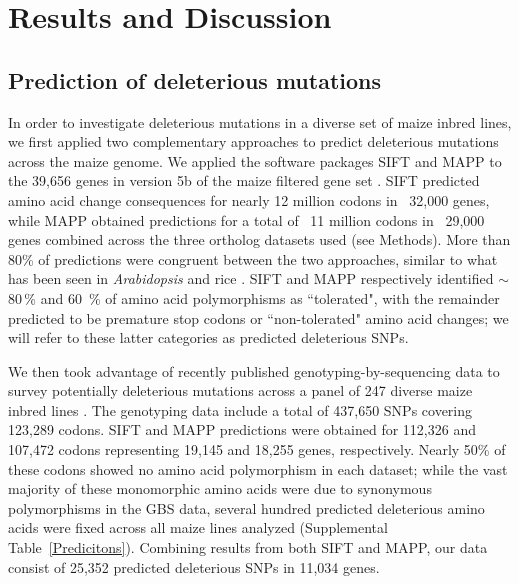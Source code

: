 \documentclass[12pt]{article}
\begin{document}
\section*{Results and Discussion}

\subsection*{Prediction of deleterious mutations}

In order to investigate deleterious mutations in a diverse set of maize inbred lines, we first applied two complementary approaches to predict deleterious mutations across the maize genome.  We applied the software packages SIFT \citep{Ng2003, Ng2006} and MAPP \citep{Stone2005} to the 39,656 genes in version 5b of the maize filtered gene set  \citep[\url{http://www.maizesequence.org};][]{Schnable2009}. SIFT predicted amino acid change consequences for nearly 12 million codons in ~32,000 genes, while MAPP obtained predictions for a total of ~11 million codons in ~29,000 genes combined across the three ortholog datasets used (see Methods). More than 80\% of predictions were congruent between the two approaches, similar to what has been seen in \emph{Arabidopsis} and rice \citep{Gunther2010}. SIFT and MAPP respectively identified $\sim$80\,\% and 60\, \% of amino acid polymorphisms as ``tolerated", with the remainder predicted to be premature stop codons or ``non-tolerated" amino acid changes; we will refer to these latter categories as predicted deleterious SNPs.

We then took advantage of recently published genotyping-by-sequencing \citep[GBS; ][]{Elshire2011} data to survey potentially deleterious mutations across a panel of 247 diverse maize inbred lines \citep{Larsson2013, Romay2013}. The genotyping data include a total of  437,650 SNPs covering 123,289 codons. SIFT and MAPP predictions were obtained for 112,326 and 107,472 codons representing 19,145 and 18,255 genes, respectively. Nearly 50\% of these codons showed no amino acid polymorphism in each dataset; while the vast majority of these monomorphic amino acids were due to synonymous polymorphisms in the GBS data, several hundred predicted deleterious amino acids were fixed across all maize lines analyzed (Supplemental Table~\ref{Predicitons}). Combining results from both SIFT and MAPP, our data consist of 25,352 predicted deleterious SNPs in 11,034 genes.
\end{document}
